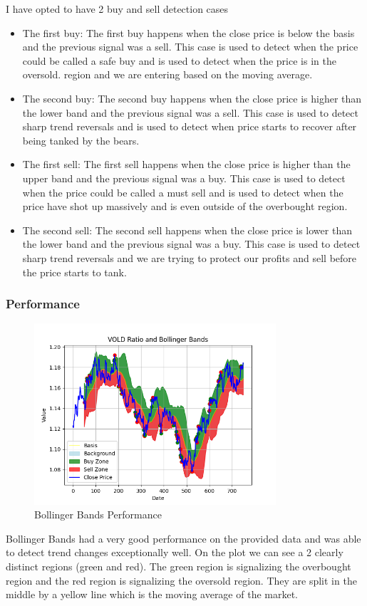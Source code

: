 \documentclass{imc-inf}
\begin{document}
	I have opted to have 2 buy and sell detection cases
	\begin{itemize}
		\item The first buy: The first buy happens when the close price is below the basis and the previous signal was a sell.
		\subitem This case is used to detect when the price could be called a safe buy and is used to detect when the price is in the oversold.
		region and we are entering based on the moving average.
		\item The second buy: The second buy happens when the close price is higher than the lower band and the previous signal was a sell. 
		\subitem This case is used to detect sharp trend reversals and is used to detect when price starts to recover after being tanked by the bears. 
		\item The first sell: The first sell happens when the close price is higher than the upper band and the previous signal was a buy.
		\subitem This case is used to detect when the price could be called a must sell and is used to detect when the price have shot up massively and 
		is even outside of the overbought region.
		\item The second sell: The second sell happens when the close price is lower than the lower band and the previous signal was a buy.
		\subitem This case is used to detect sharp trend reversals and we are trying to protect our profits and sell before the price starts to tank.
	\end{itemize}
	
	\subsubsection{Performance}
	\begin{figure}[h!]
		\centering
		\includegraphics[width=0.8\textwidth]{bollinger_bands_plot.png}
		\caption{Bollinger Bands Performance}
		\label{fig:bollinger_bands_performance}
	\end{figure}
	Bollinger Bands had a very good performance on the provided data and was able to detect trend changes exceptionally well. 
	On the plot we can see a 2 clearly distinct regions (green and red). The green region is signalizing the overbought region and the red
	region is signalizing the oversold region.
	They are split in the middle by a yellow line which is the moving average of the market. 
	
\end{document}
